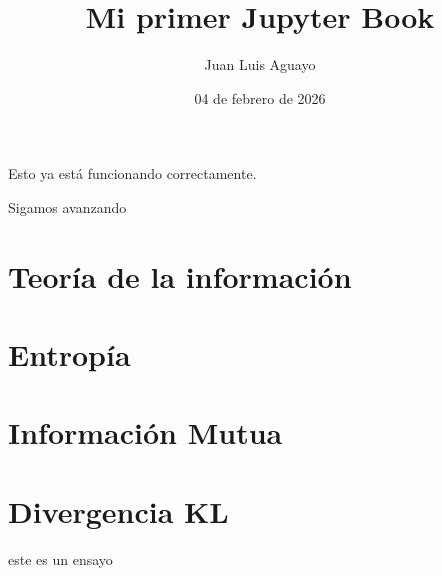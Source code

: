 \documentclass[letterpaper,10pt,spanish]{jupyterBook}
\title{Mi primer Jupyter Book}
\date{04 de febrero de 2026}
\author{Juan Luis Aguayo}
\numberwithin{equation}{chapter}
\theoremstyle{definition}
\theoremstyle{remark}
\begin{document}
\pagestyle{empty}
\sphinxmaketitle
\pagestyle{plain}
\sphinxtableofcontents
\pagestyle{normal}
\label{\detokenize{intro::doc}}


\sphinxAtStartPar
Esto ya está funcionando correctamente.

\sphinxAtStartPar
Sigamos avanzando

\sphinxstepscope


\chapter{Teoría de la información}
\label{\detokenize{teoria/teoria_de_la_informacion:teoria-de-la-informacion}}\label{\detokenize{teoria/teoria_de_la_informacion::doc}}
\sphinxstepscope


\chapter{Entropía}
\label{\detokenize{teoria/entropia:entropia}}\label{\detokenize{teoria/entropia::doc}}
\sphinxstepscope


\chapter{Información Mutua}
\label{\detokenize{teoria/informacion_mutua:informacion-mutua}}\label{\detokenize{teoria/informacion_mutua::doc}}
\sphinxstepscope


\chapter{Divergencia KL}
\label{\detokenize{teoria/divergencia_KL:divergencia-kl}}\label{\detokenize{teoria/divergencia_KL::doc}}
\sphinxstepscope

\sphinxAtStartPar
este es un ensayo







\renewcommand{\indexname}{Índice}
\printindex
\end{document}
